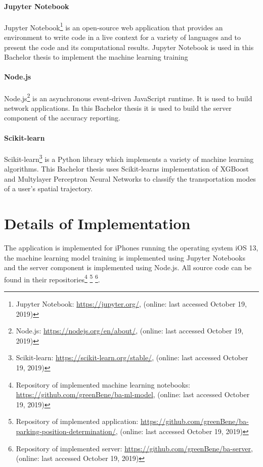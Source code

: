 \paragraph{Jupyter Notebook} Jupyter Notebook\footnote{Jupyter Notebook: \url{https://jupyter.org/}, (online: last accessed October 19, 2019)} is an open-source web application that provides an environment to write code in a live context for a variety of languages and to present the code and its computational results. Jupyter Notebook is used in this Bachelor thesis to implement the machine learning training \cite{jupyter}

\paragraph{Node.js} Node.js\footnote{Node.js: \url{https://nodejs.org/en/about/}, (online: last accessed October 19, 2019)} is an asynchronous event-driven JavaScript runtime. It is used to build network applications. In this Bachelor thesis it is used to build the server component of the accuracy reporting. \cite{node}

\paragraph{Scikit-learn} Scikit-learn\footnote{Scikit-learn: \url{https://scikit-learn.org/stable/}, (online: last accessed October 19, 2019)} is a Python library which implements a variety of machine learning algorithms. This Bachelor thesis uses Scikit-learns implementation of XGBoost and Multylayer Perceptron Neural Networks to classify the transportation modes of a user's spatial trajectory. \cite{scikit-learn}

\section{Details of Implementation}

The application is implemented for iPhones running the operating system iOS 13, the machine learning model training is implemented using Jupyter Notebooks and the server component is implemented using Node.js. All source code can be found in their repositories\footnote{Repository of implemented machine learning notebooks: \url{https://github.com/greenBene/ba-ml-model}, (online: last accessed October 19, 2019)} \footnote{Repository of implemented application: \url{https://github.com/greenBene/ba-parking-position-determination/}, (online: last accessed October 19, 2019)} \footnote{Repository of implemented server: \url{https://github.com/greenBene/ba-server}, (online: last accessed October 19, 2019)}.

